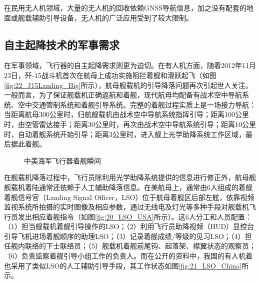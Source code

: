 在民用无人机领域，大量的无人机的回收依赖GNSS导航信息，加之没有配套的地面或舰载辅助引导设备，无人机的广泛应用受到了较大限制。

\subsection{自主起降技术的军事需求}
在军事领域，飞行器的自主起降需求则更为迫切。在有人机方面，随着2012年11月23日，歼-15战斗机首次在航母上成功实施阻拦着舰和滑跃起飞（如图\ref{fig:22_J15Landing_Big}所示），航母舰载机的引导降落问题再次引起世人关注。一般而言，为了保证舰载机正确返航和着舰，现代航母均配备有战术空中导航系统、空中交通管制系统和着舰引导系统。完整的着舰过程实质上是一场接力导航：当距离航母300公里时，归航舰载机由战术空中导航系统指挥引导；距离100公里时，由空管雷达接手；距离30公里时，再次由战术空中导航系统引导；距离10公里时，自动着舰系统开始引导；距离3公里时，进入舰上光学助降系统工作区域，最后据此着舰。

\begin{figure}[htb]
	\centering%
	\hspace{0.7em}%
	\caption{中美海军飞行器着舰瞬间}
	\label{fig:01_Landing}
\end{figure}

在舰载机降落过程中，飞行员除利用光学助降系统提供的信息进行修正外，航母舰舰载机着陆通常还依赖于人工辅助降落信息。在美航母上，通常由6人组成的着舰着舰信号官（Landing Signal Officer，LSO）位于航母着舰区后部左舷，依靠视频监视系统所拍摄的实时图像及相应参数，通过无线电及灯光等多种手段对舰载机飞行员发出相应着舰指令（如图\ref{fig:20_LSO_USA}所示）。这6人分工和人员配置：（1）担当舰载机着舰引导操作的LSO；（2）利用飞行员助降视频（HUD）显控台引导飞机进场着舰顺序的助理LSO；（3）记录着舰成绩/等级的见习LSO；（4）担任舰内联络的下士联络员；（5）舰载机着舰前尾钩、起落架、襟翼状态的观察员；（6）负责监察着舰引导小组工作的负责人。而在公开的资料中，我国的有人机着也采用了类似LSO的人工辅助引导手段，其工作状态如图\ref{fig:21_LSO_China}所示。

